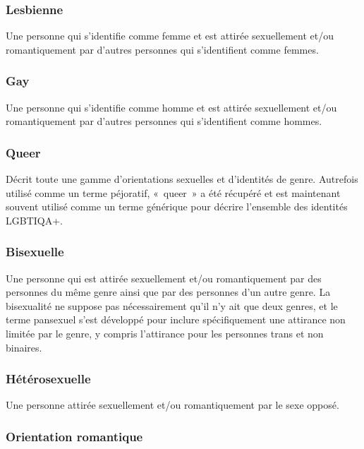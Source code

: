 \documentclass[12pt,openany]{book}
\begin{document}
\subsubsection*{Lesbienne}

\noindent Une personne qui s’identifie comme femme et est attirée sexuellement et/ou romantiquement par d’autres personnes qui s’identifient comme femmes.

\subsubsection*{Gay}

\noindent Une personne qui s’identifie comme homme et est attirée sexuellement et/ou romantiquement par d’autres personnes qui s’identifient comme hommes.

\subsubsection*{Queer}

\noindent Décrit toute une gamme d’orientations sexuelles et d’identités de genre. Autrefois utilisé comme un terme péjoratif, \mbox{« queer »} a été récupéré et est maintenant souvent utilisé comme un terme générique pour décrire l’ensemble des identités LGBTIQA+.

\subsubsection*{Bisexuelle}

\noindent Une personne qui est attirée sexuellement et/ou romantiquement par des personnes du même genre ainsi que par des personnes d’un autre genre. La bisexualité ne suppose pas nécessairement qu’il n’y ait que deux genres, et le terme pansexuel s’est développé pour inclure spécifiquement une attirance non limitée par le genre, y compris l’attirance pour les personnes trans et non binaires.

\subsubsection*{Hétérosexuelle}

\noindent Une personne attirée sexuellement et/ou romantiquement par le sexe opposé.

\subsubsection*{Orientation romantique}
\end{document}
